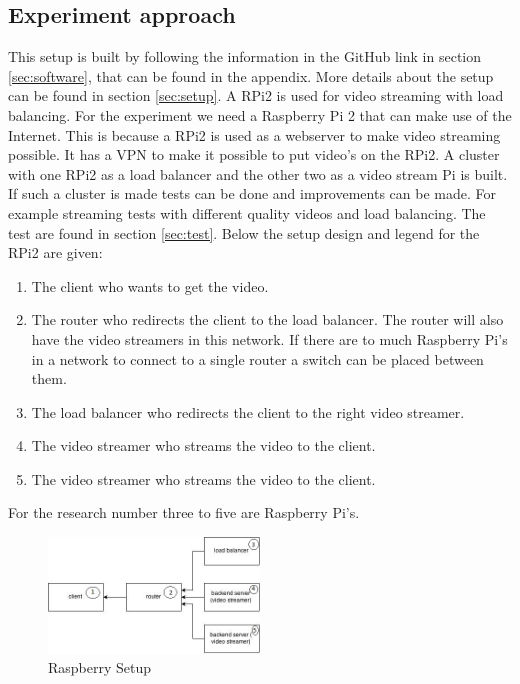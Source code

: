 \documentclass{sig-alternate-br}
\begin{document}
\subsection{Experiment approach}
This setup is built by following the information in the GitHub link in section \ref{sec:software}, that can be found in the appendix. More details about the setup can be found in section \ref{sec:setup}. \newline 
A RPi2 is used for video streaming with load balancing. For the experiment we need a Raspberry Pi 2 that can make use of the Internet. This is because a RPi2 is used as a webserver to make video streaming possible. It has a VPN to make it possible to put video's on the RPi2. 
A cluster with one RPi2 as a load balancer and the other two as a video stream Pi is built. If such a cluster is made tests can be done and improvements can be made. For example streaming tests with different quality videos and load balancing. The test are found in section \ref{sec:test}. Below the setup design and legend for the RPi2 are given:
\begin{enumerate}[topsep=0pt,itemsep=-1ex,partopsep=1ex,parsep=1ex] 
	\item The client who wants to get the video. 
	\item The router who redirects the client to the load balancer. The router will also have the video streamers in this network. If there are to much Raspberry Pi's in a network to connect to a single router a switch can be placed between them. 
	\item The load balancer who redirects the client to the right video streamer.
	\item The video streamer who streams the video to the client.
	\item The video streamer who streams the video to the client.
\end{enumerate}
For the research number three to five are Raspberry Pi's.
\begin{figure}[H]
	\centering 
	\includegraphics[width=0.5\textwidth]{raspsetup.jpg}
	\caption{Raspberry Setup}
	\label{fig:setup} %
\end{figure}
\end{document}
